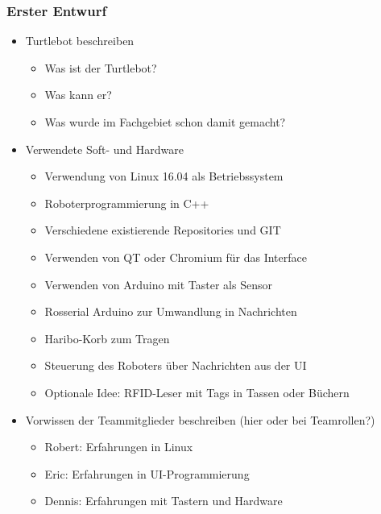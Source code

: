 \documentclass[a4paper,12pt,headsepline]{scrartcl}
\begin{document}
\subsubsection{Erster Entwurf}	
		\begin{itemize}
			\item Turtlebot beschreiben
			\begin{itemize}
				\item Was ist der Turtlebot?
				\item Was kann er?
				\item Was wurde im Fachgebiet schon damit gemacht?
			\end{itemize}
			
			\item Verwendete Soft- und Hardware
			\begin{itemize}
				\item Verwendung von Linux 16.04 als Betriebssystem
				\item Roboterprogrammierung in C++
				\item Verschiedene existierende Repositories und GIT
				\item Verwenden von QT oder Chromium für das Interface
				\item Verwenden von Arduino mit Taster als Sensor
				\item Rosserial Arduino zur Umwandlung in Nachrichten
				\item Haribo-Korb zum Tragen
				\item Steuerung des Roboters über Nachrichten aus der UI
				\item Optionale Idee: RFID-Leser mit Tags in Tassen oder Büchern
			\end{itemize}
			
			\item Vorwissen der Teammitglieder beschreiben (hier oder bei Teamrollen?)
			\begin{itemize}
				\item Robert: Erfahrungen in Linux
				\item Eric: Erfahrungen in UI-Programmierung
				\item Dennis: Erfahrungen mit Tastern und Hardware
			\end{itemize}
		\end{itemize}
\end{document}
